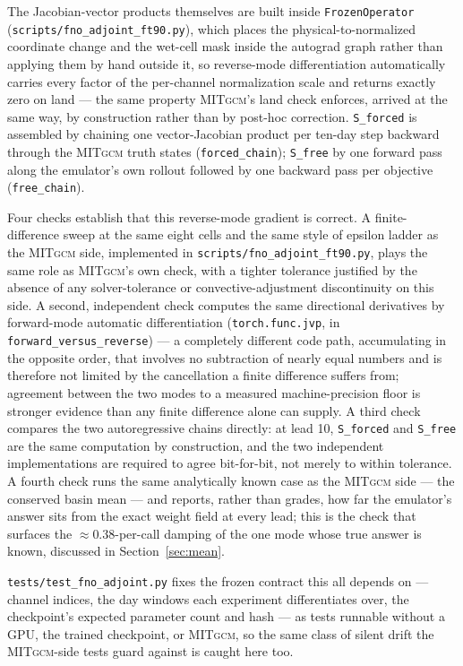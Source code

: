 \documentclass[3p,12pt]{elsarticle}
\newcommand{\MITgcm}{\textsc{MITgcm}}
\begin{document}
The Jacobian-vector products themselves are built inside
\texttt{FrozenOperator} (\texttt{scripts/\allowbreak fno\_adjoint\_ft90.py}), which places
the physical-to-normalized coordinate change and the wet-cell mask inside the
autograd graph rather than applying them by hand outside it, so reverse-mode
differentiation automatically carries every factor of the per-channel
normalization scale and returns exactly zero on land --- the same property
\MITgcm{}'s land check enforces, arrived at the same way, by construction
rather than by post-hoc correction. \texttt{S\_forced} is assembled by
chaining one vector-Jacobian product per ten-day step backward through the
\MITgcm{} truth states (\texttt{forced\_chain}); \texttt{S\_free} by one
forward pass along the emulator's own rollout followed by one backward pass
per objective (\texttt{free\_chain}).

Four checks establish that this reverse-mode gradient is correct. A
finite-difference sweep at the same eight cells and the same style of
epsilon ladder as the \MITgcm{} side, implemented in
\texttt{scripts/fno\_adjoint\_ft90.py}, plays the same role as \MITgcm{}'s own
check, with a tighter tolerance justified by the absence of any
solver-tolerance or convective-adjustment discontinuity on this side. A
second, independent check computes the same directional derivatives by
forward-mode automatic differentiation (\texttt{torch.func.jvp}, in
\texttt{forward\_versus\_reverse}) --- a completely different code path,
accumulating in the opposite order, that involves no subtraction of nearly
equal numbers and is therefore not limited by the cancellation a finite
difference suffers from; agreement between the two modes to a measured
machine-precision floor is stronger evidence than any finite difference alone
can supply. A third check compares the two autoregressive chains directly: at
lead 10, \texttt{S\_forced} and \texttt{S\_free} are the same computation by
construction, and the two independent implementations are required to agree
bit-for-bit, not merely to within tolerance. A fourth check runs the same
analytically known case as the \MITgcm{} side --- the conserved basin mean ---
and reports, rather than grades, how far the emulator's answer sits from the
exact weight field at every lead; this is the check that surfaces the
$\approx0.38$-per-call damping of the one mode whose true answer is known,
discussed in Section~\ref{sec:mean}.

\texttt{tests/test\_fno\_adjoint.py} fixes the frozen contract this all
depends on --- channel indices, the day windows each experiment differentiates
over, the checkpoint's expected parameter count and hash --- as tests runnable
without a GPU, the trained checkpoint, or \MITgcm{}, so the same class of
silent drift the \MITgcm{}-side tests guard against is caught here too.
\end{document}
